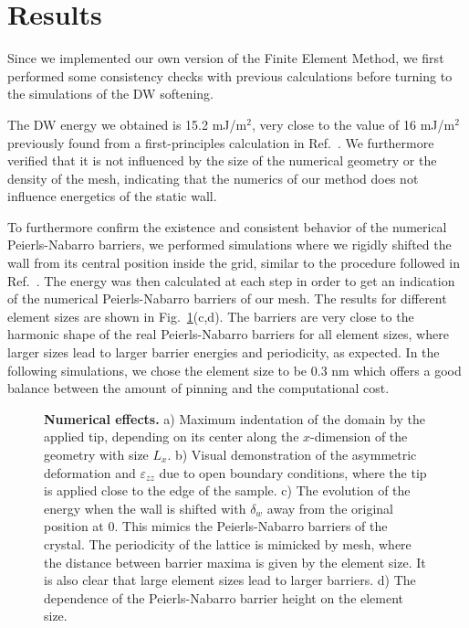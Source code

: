 \section{Results}
Since we implemented our own version of the Finite Element Method, we first performed some consistency checks with previous calculations before turning to the simulations of the DW softening.

The DW energy we obtained is 15.2 mJ/m$^2$, very close to the value of 16 mJ/m$^2$ previously found from a first-principles calculation in Ref.~\cite{Padilla1996}.
We furthermore verified that it is not influenced by the size of the numerical geometry or the density of the mesh, indicating that the numerics of our method does not influence energetics of the static wall.

To furthermore confirm the existence and consistent behavior of the numerical Peierls-Nabarro barriers, we performed simulations where we rigidly shifted the wall from its central position inside the grid, similar to the procedure followed in Ref.~\cite{Marton2018}.
The energy was then calculated at each step in order to get an indication of the numerical Peierls-Nabarro barriers of our mesh.
The results for different element sizes are shown in Fig.~\ref{fig:BTO_numerical_effects}(c,d).
The barriers are very close to the harmonic shape of the real Peierls-Nabarro barriers for all element sizes, where larger sizes lead to larger barrier energies and periodicity, as expected.
In the following simulations, we chose the element size to be 0.3 nm which offers a good balance between the amount of pinning and the computational cost. 
\begin{figure}[h!]
	\caption{\label{fig:BTO_numerical_effects}{\bf Numerical effects.} a) Maximum indentation of the domain by the applied tip, depending on its center along the $x$-dimension of the geometry with size $L_x$. b) Visual demonstration of the asymmetric deformation and $\varepsilon_{zz}$ due to open boundary conditions, where the tip is applied close to the edge of the sample. c) The evolution of the energy when the wall is shifted with $\delta_w$ away from the original position at 0. This mimics the Peierls-Nabarro barriers of the crystal. The periodicity of the lattice is mimicked by mesh, where the distance between barrier maxima is given by the element size. It is also clear that large element sizes lead to larger barriers. d) The dependence of the Peierls-Nabarro barrier height on the element size.}
\end{figure}
